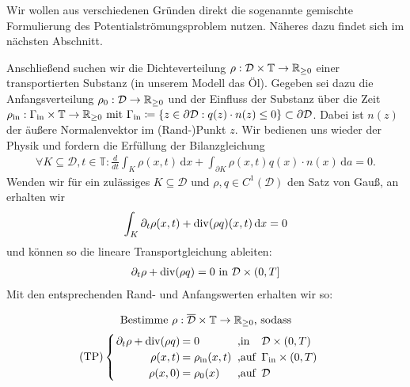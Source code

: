 \begin{Bemerkung}
	Wir wollen aus verschiedenen Gründen direkt die sogenannte gemischte Formulierung des Potentialströmungsproblem nutzen. Näheres dazu findet sich im nächsten Abschnitt.
\end{Bemerkung}
Anschließend suchen wir die Dichteverteilung $\rho: \mathcal{D} \times \mathbb{T} \rightarrow \mathbb{R}_{\geq0} $ einer transportierten Substanz (in unserem Modell das Öl).  \newline
Gegeben sei dazu die Anfangsverteilung $\rho_0: \mathcal{D} \rightarrow \mathbb{R}_{\geq0}$ und der Einfluss der Substanz über die Zeit
$
\rho_{\text{in}} : \Gamma_{\text{in}} \times \mathbb{T} \rightarrow \mathbb{R}_{\geq0} \text{ mit }  \Gamma_{\text{in}} \coloneqq  \{ z \in \partial \mathcal{D}: q(z)\cdot n(z) \leq 0 \} \subset  \partial \mathcal{D}
$.
Dabei ist $n(z)$ der äußere Normalenvektor im (Rand-)Punkt $z$.
Wir bedienen uns wieder der Physik und fordern die Erfüllung der Bilanzgleichung
\begin{align*}
\forall K \subseteq \mathcal{D} , t\in \mathbb{T} : \frac{d}{dt} \int_K \rho(x,t) \, \mathrm{d}x + \int_{\partial K} \rho(x,t)q(x)\cdot n(x) \, \mathrm{d}a = 0.
\end{align*}
Wenden wir für ein zulässiges $K \subseteq \mathcal{D}$ und $\rho,q \in C^1(\mathcal{D})$ den Satz von Gauß, an erhalten wir
\begin{align*}
\int_K \partial_t \rho(x,t) + \operatorname{div} (\rho q)(x,t) \, \mathrm{d}x = 0
\end{align*}
und können so die lineare Transportgleichung ableiten:
\begin{align*}
\partial_t \rho + \operatorname{div} (\rho q) = 0 \text{ in } \mathcal{D} \times (0,T]
\end{align*}
Mit den entsprechenden Rand- und Anfangswerten erhalten wir so:

\[ 
\text{Bestimme } \rho: \overline{\mathcal{D}} \times \mathbb{T} \to \R_{\geq 0} \text{, sodass} \newline \]
\[\setlength\arraycolsep{1pt}
\text{(TP)}\begin{cases} 
\begin{array}{rlll}
\partial_t \rho + \dive(\rho q) &= 0 &\text{ ,in } &\mathcal{D} \times (0,T)\\
\rho(x,t) &= \rho_{\text{in}}(x,t) &\text{ ,auf } &\Gamma_{\text{in}} \times (0,T)\\
\rho(x,0) &= \rho_0(x) &\text{ ,auf } &\mathcal{D} \\
\end{array}
\end{cases} \\
\]

